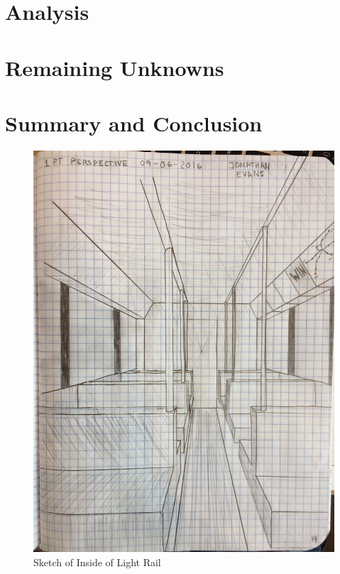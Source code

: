 \documentclass[11pt]{article}
\begin{document}
\section{Analysis}


\section{Remaining Unknowns}


\section{Summary and Conclusion}

\pagebreak
\begin{figure}[H]
    \centering
    \includegraphics[width=160mm]{resources/light-rail-sketch.jpg}
    \caption{Sketch of Inside of Light Rail}
\end{figure}
\end{document}
